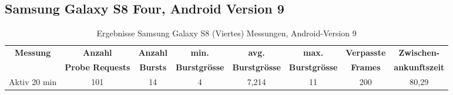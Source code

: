 \begin{landscape}
   \subsection*{Samsung Galaxy S8 Four, Android Version 9}
   \begin{table}[h!]
      \centering
      \begin{tabular}{|c|c|c|c|c|c|c|c|}
      \hline
      \textbf{Messung} & \textbf{Anzahl} & \textbf{Anzahl} & \textbf{min.} & \textbf{avg.} & \textbf{max.} & \textbf{Verpasste} & \textbf{Zwischen-}\\
      & \textbf{Probe Requests} & \textbf{Bursts} & \textbf{Burstgrösse} & \textbf{Burstgrösse} & \textbf{Burstgrösse} & \textbf{Frames} & \textbf{ankunftszeit}\\
      \hline
      Aktiv 20 min & 101 & 14 & 4 & 7,214 & 11 & 200 & 80,29 \\
      \hline
      \end{tabular}
      \caption{Ergebnisse Samsung Galaxy S8 (Viertes) Messungen, Android-Version 9
      \label{table:samsunggalaxys8-4-9-results}} 
   \end{table}

   \clearpage


\end{landscape}
